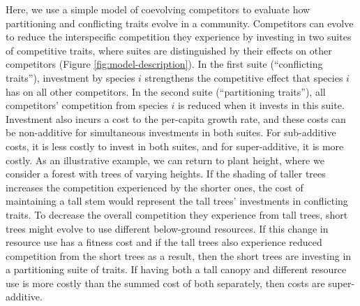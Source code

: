 Here, we use a simple model of coevolving competitors to evaluate how 
partitioning and conflicting traits evolve in a community.
Competitors can evolve to reduce the interspecific competition they experience
by investing in two suites of competitive traits, where suites are 
distinguished by their effects on other competitors
(Figure \ref{fig:model-description}).
In the first suite (``conflicting traits''), investment by species $i$
strengthens the competitive effect that species $i$ has on all
other competitors.
In the second suite (``partitioning traits''), all competitors' competition
from species $i$ is reduced when it invests in this suite.
Investment also incurs a cost to the per-capita growth rate, and 
these costs can be non-additive for simultaneous investments in both suites.
For sub-additive costs, it is less costly to invest in both suites, and
for super-additive, it is more costly.
As an illustrative example, we can return to plant height, where we
consider a forest with trees of varying heights.
If the shading of taller trees increases the competition experienced by 
the shorter ones, the cost of maintaining a tall stem would represent the 
tall trees' investments in conflicting traits.
To decrease the overall competition they experience from tall trees,
short trees might evolve to use different below-ground resources.
If this change in resource use has a fitness cost and if the tall trees also
experience reduced competition from the short trees as a result, then 
the short trees are investing in a partitioning suite of traits.
If having both a tall canopy and different resource use is more costly
than the summed cost of both separately, then costs are super-additive.



